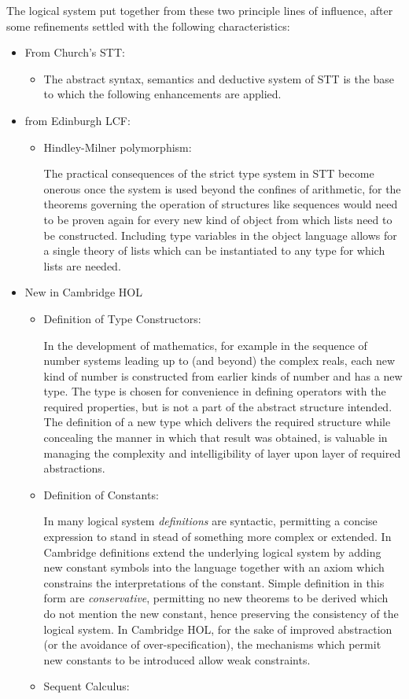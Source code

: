 \documentclass[10pt,titlepage]{book}
\begin{document}
The logical system put together from these two principle lines of influence, after some refinements settled with the following characteristics:

\begin{itemize}
\item From Church's STT:
  \begin{itemize}
  \item The abstract syntax, semantics and deductive system of STT is the base to which the following enhancements are applied.
  \end{itemize}
\item from Edinburgh LCF:
  \begin{itemize}
  \item Hindley-Milner polymorphism:
    
    The practical consequences of the strict type system in STT become onerous once the system is used beyond the confines of arithmetic, for the theorems governing the operation of structures like sequences would need to be proven again for every new kind of object from which lists need to be constructed.  Including type variables in the object language allows for a single theory of lists which can be instantiated to any type for which lists are needed.
  \end{itemize}
\item New in Cambridge HOL
  \begin{itemize}
  \item Definition of Type Constructors:
    
    In the development of mathematics, for example in the sequence of number systems leading up to (and beyond) the complex reals, each new kind of number is constructed from earlier kinds of number and has a new type.  The type is chosen for convenience in defining operators with the required properties, but is not a part of the abstract structure intended.  The definition of a new type which delivers the required structure while concealing the manner in which that result was obtained, is valuable in managing the complexity and intelligibility of layer upon layer of required abstractions.
  \item Definition of Constants:
    
    In many logical system \emph{definitions} are syntactic, permitting a concise expression to stand in stead of something more complex or extended.
    In Cambridge definitions extend the underlying logical system by adding new constant symbols into the language together with an axiom which constrains the interpretations of the constant.
    Simple definition in this form are \emph{conservative}, permitting no new theorems to be derived which do not mention the new constant, hence preserving the consistency of the logical system.
    In Cambridge HOL, for the sake of improved abstraction (or the avoidance of over-specification), the mechanisms which permit new constants to be introduced allow weak constraints.
  \item Sequent Calculus:


\end{itemize}
\end{itemize}
\end{document}
